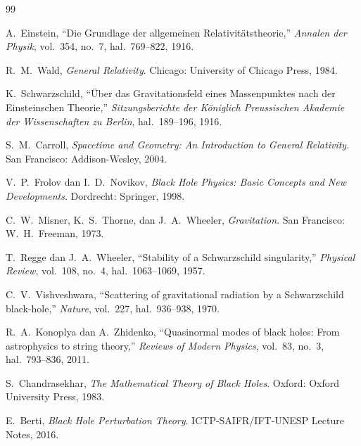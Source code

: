 
\begingroup
\fontsize{8}{10}\selectfont
\begin{thebibliography}{99}

A.~Einstein, ``Die Grundlage der allgemeinen Relativit\"{a}tstheorie,''
\textit{Annalen der Physik}, vol.~354, no.~7, hal.~769--822, 1916.

R.~M.~Wald, \textit{General Relativity}.
Chicago: University of Chicago Press, 1984.

K.~Schwarzschild, ``\"{U}ber das Gravitationsfeld eines Massenpunktes nach der
Einsteinschen Theorie,'' \textit{Sitzungsberichte der K\"{o}niglich Preussischen
Akademie der Wissenschaften zu Berlin}, hal.~189--196, 1916.

S.~M.~Carroll, \textit{Spacetime and Geometry: An Introduction to General
Relativity}. San Francisco: Addison-Wesley, 2004.

V.~P.~Frolov dan I.~D.~Novikov, \textit{Black Hole Physics: Basic Concepts and New
Developments}. Dordrecht: Springer, 1998.

C.~W.~Misner, K.~S.~Thorne, dan J.~A.~Wheeler, \textit{Gravitation}.
San Francisco: W.~H.~Freeman, 1973.

T.~Regge dan J.~A.~Wheeler, ``Stability of a Schwarzschild singularity,''
\textit{Physical Review}, vol.~108, no.~4, hal.~1063--1069, 1957.

C.~V.~Vishveshwara, ``Scattering of gravitational radiation by a Schwarzschild
black-hole,'' \textit{Nature}, vol.~227, hal.~936--938, 1970.

R.~A.~Konoplya dan A.~Zhidenko, ``Quasinormal modes of black holes: From
astrophysics to string theory,'' \textit{Reviews of Modern Physics}, vol.~83,
no.~3, hal.~793--836, 2011.

S.~Chandrasekhar, \textit{The Mathematical Theory of Black Holes}.
Oxford: Oxford University Press, 1983.

E.~Berti, \textit{Black Hole Perturbation Theory}.
ICTP-SAIFR/IFT-UNESP Lecture Notes, 2016.


\end{thebibliography}
